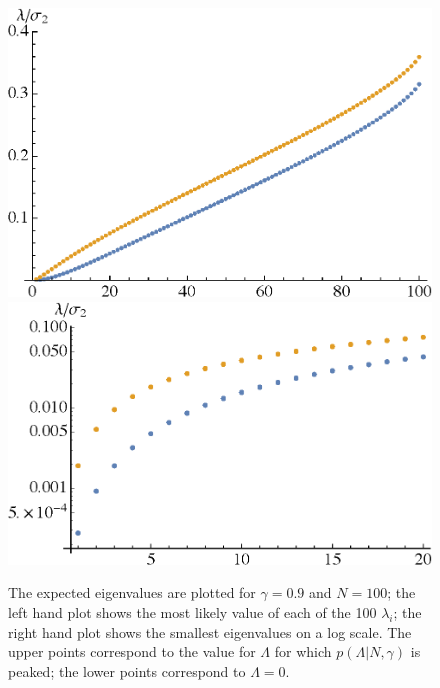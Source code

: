 \documentclass[12pt]{article}
\newcommand{\re}[1]{\textcolor{blue}{[{\bf RE}: #1]}}
\newcommand{\lfl}[1]{\textcolor{red}{[{\bf LL}: #1]}}
\newcommand{\SH}[1]{\textcolor{brown}{[{\bf SH}: #1]}}
\begin{document}

\begin{figure} 
  \centering
  \includegraphics[width=.45\linewidth]{l1_100.eps} \hfill \includegraphics[width=.45\linewidth]{l2_100.eps}
  \caption{The expected eigenvalues are plotted for $\gamma=0.9$ and $N=100$; the left hand plot shows the most likely value of each of the 100 $\lambda_i$; the right hand plot shows the smallest eigenvalues on a log scale. The upper points correspond to the value for $\Lambda$ for which $p(\Lambda| N,\gamma)$  is peaked; the lower points correspond to $\Lambda=0$.}
  \label{eigendist2}
\end{figure}

\end{document}
